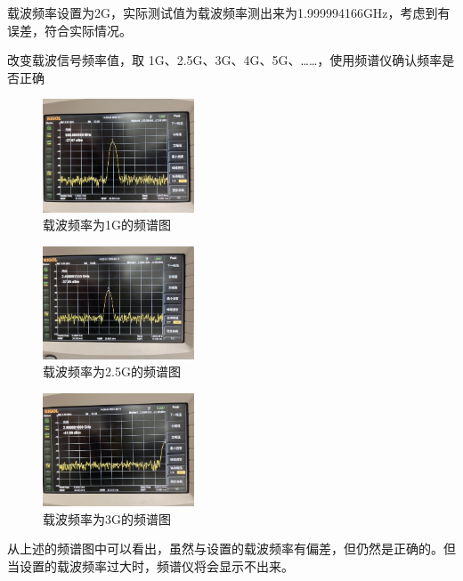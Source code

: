 \documentclass{../source/Experiment}
\begin{document}
        载波频率设置为2G，实际测试值为载波频率测出来为1.999994166GHz，考虑到有误差，符合实际情况。

        改变载波信号频率值，取 1G、2.5G、3G、4G、5G、……，使用频谱仪确认频率是 否正确
        \begin{figure}[H]
            \centering
            \includegraphics[width = 0.4\textwidth,angle=180]{lab9/1.jpg}
            \caption{载波频率为1G的频谱图}
        \end{figure}

        \begin{figure}[H]
            \centering
            \includegraphics[width = 0.4\textwidth,angle=180]{lab9/2.jpg}
            \caption{载波频率为2.5G的频谱图}
        \end{figure}
        \begin{figure}[H]
            \centering
            \includegraphics[width = 0.4\textwidth,angle=180]{lab9/3.jpg}
            \caption{载波频率为3G的频谱图}
        \end{figure}

        从上述的频谱图中可以看出，虽然与设置的载波频率有偏差，但仍然是正确的。但当设置的载波频率过大时，频谱仪将会显示不出来。
\end{document}
